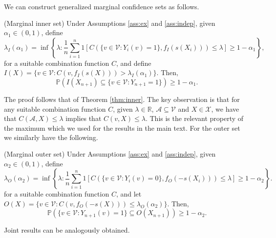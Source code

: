 We can construct generalized marginal confidence sets as follows.
\begin{theorem}\label{thm:innergen}
	(Marginal inner set)
	Under Assumptions \ref{ass:ex} and \ref{ass:indep}, given $\alpha_1 \in (0,1)$, define 
	\begin{equation*}
		\lambda_I(\alpha_1) = \inf\left\lbrace \lambda: \frac{1}{n} \sum_{i = 1}^n 1\left[ C(\lbrace v \in \mathcal{V}: Y_i(v) = 1\rbrace, f_I(s(X_i))) \leq \lambda \right] \geq 1-\alpha_1 \right\rbrace,
	\end{equation*}
 	for a suitable combination function $C$, and define $I(X) = \lbrace v \in \mathcal{V}: C(v, f_I(s(X))) >\lambda_I(\alpha_1)  \rbrace $. Then,
	\begin{equation}\label{eq:probstat}
		\mathbb{P}\left( I(X_{n+1}) \subseteq\lbrace v\in \mathcal{V}: Y_{n+1} = 1 \rbrace \right) \geq 1 - \alpha_1.
	\end{equation}
\end{theorem}
The proof follows that of Theorem \ref{thm:inner}. The key observation is that for any suitable combination function $C$,  given $\lambda \in \mathbb{R}$, $\mathcal{A} \subseteq \mathcal{V} $ and $X \in \mathcal{X}$, we have that $C(\mathcal{A}, X) \leq \lambda$ implies that $C(v, X) \leq \lambda$. This is the relevant property of the maximum which we used for the results in the main text. For the outer set we similarly have the following.
\begin{theorem}\label{thm:genouter}
	(Marginal outer set)
	Under Assumptions \ref{ass:ex} and \ref{ass:indep}, given $\alpha_2 \in (0,1)$, define 
	\begin{equation*}
		\lambda_O({\alpha_2})= \inf\left\lbrace \lambda: \frac{1}{n} \sum_{i = 1}^n 1\left[ C(\lbrace v \in \mathcal{V}: Y_i(v) = 0\rbrace, f_O(-s(X_i))) \leq \lambda \right] \geq 1-\alpha_2 \right\rbrace.
	\end{equation*}
	for a suitable combination function $C$, and let $O(X) = \lbrace v \in \mathcal{V}: C(v, f_O(-s(X))) \leq \lambda_O(\alpha_2)  \rbrace $. Then,
	\begin{equation}\label{eq:probstat}
		\mathbb{P}\left( \lbrace v\in \mathcal{V}: Y_{n+1}(v) = 1 \rbrace \subseteq O(X_{n+1}) \right) \geq 1 - \alpha_2.
	\end{equation}
\end{theorem}
Joint results can be analogously obtained. 

